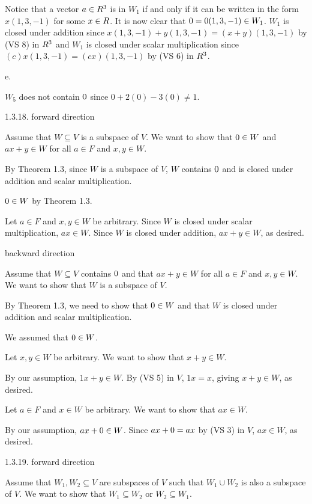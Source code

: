 Notice that a vector $a \in {\sl R}^3$ is in $W_1$ if and only if
it can be written in the form $x(1,3,-1)$ for some $x \in {\sl R}$.
It is now clear that ${\sl 0} = 0(1,3,-1) \in W_1$.
$W_1$ is closed under addition since
$x(1,3,-1) + y(1,3,-1) = (x + y)(1,3,-1)$ by (VS 8) in ${\sl R}^3$
and $W_1$ is closed under scalar multiplication since
$(c)x(1,3,-1) = (cx)(1,3,-1)$ by (VS 6) in ${\sl R}^3$.

\item{} e.

$W_5$ does not contain ${\sl 0}$ since $0 + 2(0) - 3(0) \ne 1$.
\medskip\goodbreak
\item{1.3.18.} forward direction

Assume that $W \subseteq V$ is a subspace of $V$.
We want to show that ${\sl 0} \in W$ and
$ax + y \in W$ for all $a \in F$ and $x,y \in W$.

By Theorem 1.3, since $W$ is a subspace of $V$,
$W$ contains ${\sl 0}$ and is closed under addition and scalar multiplication.

${\sl 0} \in W$ by Theorem 1.3.

Let $a \in F$ and $x,y \in W$ be arbitrary.
Since $W$ is closed under scalar multiplication, $ax \in W$.
Since $W$ is closed under addition, $ax + y \in W$, as desired.

\item{} backward direction

Assume that $W \subseteq V$ contains ${\sl 0}$ and that
$ax + y \in W$ for all $a \in F$ and $x,y \in W$.
We want to show that $W$ is a subspace of $V$.

By Theorem 1.3, we need to show that ${\sl 0} \in W$
and that $W$ is closed under addition and scalar multiplication.

We assumed that ${\sl 0} \in W$.

Let $x,y \in W$ be arbitrary.
We want to show that $x + y \in W$.

By our assumption, $1x + y \in W$.
By (VS 5) in $V$, $1x = x$, giving $x + y \in W$, as desired.

Let $a \in F$ and $x \in W$ be arbitrary.
We want to show that $ax \in W$.

By our assumption, $ax + {\sl 0} \in W$.
Since $ax + {\sl 0} = ax$ by (VS 3) in $V$,
$ax \in W$, as desired.
\medskip\goodbreak
\item{1.3.19.} forward direction

Assume that $W_1,W_2 \subseteq V$ are subspaces of $V$
such that $W_1 \cup W_2$ is also a subspace of $V$.
We want to show that $W_1 \subseteq W_2$ or $W_2 \subseteq W_1$.

